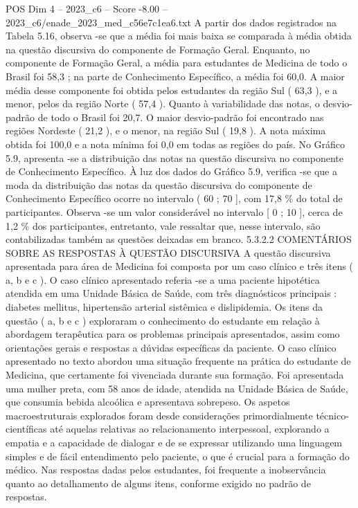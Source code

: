 \begin{textsample}{POS Dim 4 – 2023\_c6 – Score -8.00 – 2023\_c6/enade\_2023\_med\_c56e7c1ea6.txt}
A partir dos dados registrados na Tabela 5.16, observa -se que a média foi mais baixa se comparada à média obtida na questão discursiva do componente de Formação Geral.
Enquanto, no componente de Formação Geral, a média para estudantes de Medicina de todo o Brasil foi 58,3 ; na parte de Conhecimento Específico, a média foi 60,0.
A maior média desse componente foi obtida pelos estudantes da região Sul ( 63,3 ), e a menor, pelos da região Norte ( 57,4 ).
Quanto à variabilidade das notas, o desvio-padrão de todo o Brasil foi 20,7.
O maior desvio-padrão foi encontrado nas regiões Nordeste ( 21,2 ), e o menor, na região Sul ( 19,8 ).
A nota máxima obtida foi 100,0 e a nota mínima foi 0,0 em todas as regiões do país.
No Gráfico 5.9, apresenta -se a distribuição das notas na questão discursiva no componente de Conhecimento Específico.
À luz dos dados do Gráfico 5.9, verifica -se que a moda da distribuição das notas da questão discursiva do componente de Conhecimento Específico ocorre no intervalo ( 60 ; 70 ], com 17,8 \% do total de participantes.
Observa -se um valor considerável no intervalo [ 0 ; 10 ], cerca de 1,2 \% dos participantes, entretanto, vale ressaltar que, nesse intervalo, são contabilizadas também as questões deixadas em branco. 5.3.2.2 COMENTÁRIOS SOBRE AS RESPOSTAS À QUESTÃO DISCURSIVA A questão discursiva apresentada para área de Medicina foi composta por um caso clínico e três itens ( a, b e c ).
O caso clínico apresentado referia -se a uma paciente hipotética atendida em uma Unidade Básica de Saúde, com três diagnósticos principais : diabetes mellitus, hipertensão arterial sistêmica e dislipidemia.
Os itens da questão ( a, b e c ) exploraram o conhecimento do estudante em relação à abordagem terapêutica para os problemas principais apresentados, assim como orientações gerais e respostas a dúvidas específicas da paciente.
O caso clínico apresentado no texto abordou uma situação frequente na prática do estudante de Medicina, que certamente foi vivenciada durante sua formação.
Foi apresentada uma mulher preta, com 58 anos de idade, atendida na Unidade Básica de Saúde, que consumia bebida alcoólica e apresentava sobrepeso.
Os aspetos macroestruturais explorados foram desde considerações primordialmente técnico-científicas até aquelas relativas ao relacionamento interpessoal, explorando a empatia e a capacidade de dialogar e de se expressar utilizando uma linguagem simples e de fácil entendimento pelo paciente, o que é crucial para a formação do médico.
Nas respostas dadas pelos estudantes, foi frequente a inobservância quanto ao detalhamento de alguns itens, conforme exigido no padrão de respostas.

\end{textsample}
